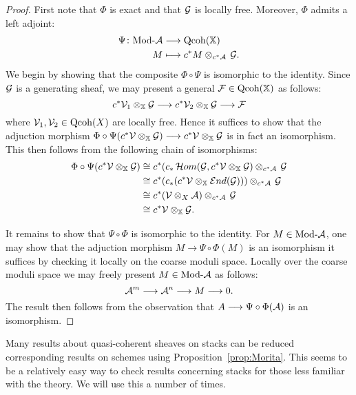 \documentclass[12pt]{amsart}
\begin{document}
\begin{proof}
First note that $\Phi$ is exact and that $\mathcal{G}$ is locally free. Moreover, $\Phi$ admits a left adjoint:
\begin{align*}
\Psi \colon \textup{Mod-}\mathcal{A} &\longrightarrow \operatorname{Qcoh} (\mathbb{X}) \\
 M & \longmapsto c^*M \otimes_{c^* \mathcal{A}} \, \mathcal{G}.
\end{align*}
We begin by showing that the composite $\Phi \circ \Psi$ is isomorphic to the identity. 
Since $\mathcal{G}$ is a generating sheaf, we may present a general $\mathcal{F} \in \operatorname{Qcoh}(\mathbb{X})$ as follows: $$c^* \mathcal{V}_1 \otimes_{\mathbb{X}} \mathcal{G} \longrightarrow c^* \mathcal{V}_2 \otimes_{\mathbb{X}} \mathcal{G} \longrightarrow \mathcal{F}$$ where $\mathcal{V}_1, \mathcal{V}_2 \in \operatorname{Qcoh}(X)$ are locally free. 
Hence it suffices to show that the adjuction morphism $\Phi \circ \Psi (c^* \mathcal{V} \otimes_{\mathbb{X}} \mathcal{G}) \longrightarrow c^* \mathcal{V} \otimes_{\mathbb{X}} \mathcal{G}$ is in fact an isomorphism.
This then follows from the following chain of isomorphisms:
\begin{align*}
\Phi \circ \Psi (c^* \mathcal{V} \otimes_{\mathbb{X}} \mathcal{G}) &\cong c^*(c_* \mathop{{\mathcal{H}}om}\nolimits(\mathcal{G}, c^* \mathcal{V} \otimes_{\mathbb{X}} \mathcal{G}) \otimes_{c^* \mathcal{A}} \, \mathcal{G} \\
& \cong c^*(c_* (c^* \mathcal{V} \otimes_{\mathbb{X}} \mathop{{\mathcal{E}}nd}\nolimits(\mathcal{G}))) \otimes_{c^* \mathcal{A}} \, \mathcal{G} \\
& \cong c^* (\mathcal{V} \otimes_X \mathcal{A}) \otimes_{c^* \mathcal{A}} \, \mathcal{G} \\
& \cong c^*\mathcal{V} \otimes_{\mathbb{X}} \mathcal{G}.
\end{align*}

It remains to show that $\Psi \circ \Phi$ is isomorphic to the identity.
For $M \in \textup{Mod-}\mathcal{A}$, one may show that the adjuction morphism $M \rightarrow \Psi \circ \Phi(M)$ is an isomorphism it suffices by checking it locally on the coarse moduli space. 
Locally over the coarse moduli space we may freely present $M \in \textup{Mod-}\mathcal{A}$ as follows: $$\mathcal{A}^m \longrightarrow \mathcal{A}^n \longrightarrow M \longrightarrow 0.$$ 
The result then follows from the observation that $A \longrightarrow \Psi \circ \Phi (\mathcal{A})$ is an isomorphism.
\end{proof}

\begin{remark}  \label{rem:Morita}
Many results about quasi-coherent sheaves on stacks can be reduced corresponding results on schemes using Proposition~\ref{prop:Morita}. This seems to be a relatively easy way to check results concerning stacks for those less familiar with the theory. We will use this a number of times.
\end{remark}
\end{document}
